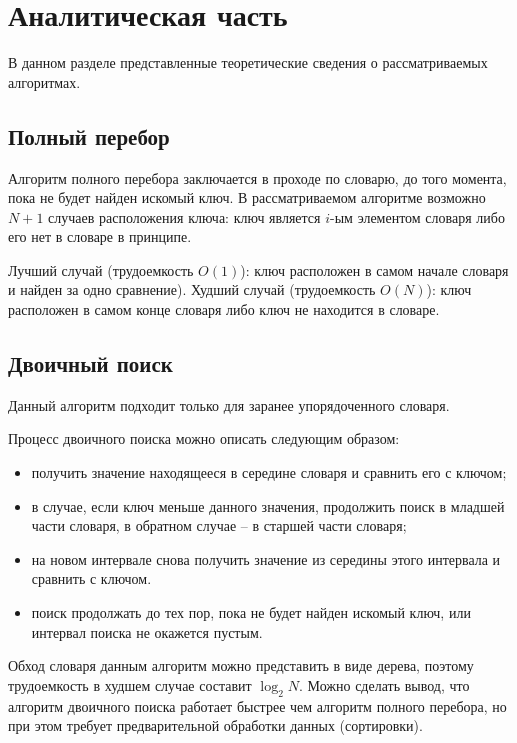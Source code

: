 \documentclass[12pt]{report}
\begin{document}
	\chapter{Аналитическая часть}
	
	В данном разделе представленные теоретические сведения о рассматриваемых алгоритмах.
	
	\section{Полный перебор}
	
	Алгоритм полного перебора заключается в проходе по словарю, до того момента, пока не будет найден искомый ключ. В рассматриваемом алгоритме возможно $N + 1$ случаев расположения ключа: ключ является $i$-ым элементом словаря либо его нет в словаре в принципе. 
	
	Лучший случай (трудоемкость $O(1)$): ключ расположен в самом начале словаря и найден за одно сравнение). Худший случай (трудоемкость $O(N)$): ключ расположен в самом конце словаря либо ключ не находится в словаре.
	
	\section{Двоичный поиск}
	
	Данный алгоритм подходит только для заранее упорядоченного словаря.
	
	Процесс двоичного поиска можно описать следующим образом: 
	
	\begin{itemize}
		\item получить значение находящееся в середине словаря и сравнить его с ключом;
		\item в случае, если ключ меньше данного значения, продолжить поиск в младшей части словаря, в обратном случае -- в старшей части словаря;
		\item на новом интервале снова получить значение из середины этого интервала и сравнить с ключом.
		\item поиск продолжать до тех пор, пока не будет найден искомый ключ, или интервал поиска не окажется пустым.
	\end{itemize}
	
	Обход словаря данным алгоритм можно представить в виде дерева, поэтому трудоемкость в худшем случае составит $\log_{2}{N}$. Можно сделать вывод, что алгоритм двоичного поиска работает быстрее чем алгоритм полного перебора, но при этом требует предварительной обработки данных (сортировки).
	
\end{document}
